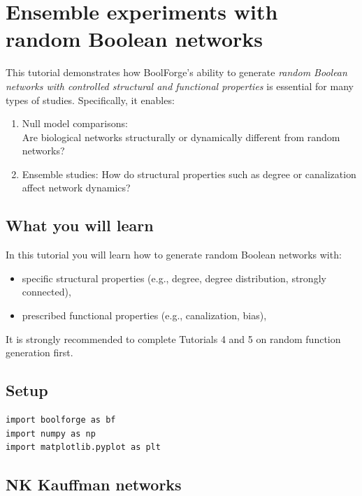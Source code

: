 \documentclass[
]{article}
\providecommand{\tightlist}{%
  \setlength{\itemsep}{0pt}\setlength{\parskip}{0pt}}
\begin{document}
\section{Ensemble experiments with random Boolean
networks}\label{ensemble-experiments-with-random-boolean-networks}

This tutorial demonstrates how BoolForge's ability to generate
\emph{random Boolean networks with controlled structural and functional
properties} is essential for many types of studies. Specifically, it
enables:

\begin{enumerate}
\def\labelenumi{\arabic{enumi}.}
\item
  Null model comparisons:\\
  Are biological networks structurally or dynamically different from
  random networks?
\item
  Ensemble studies: How do structural properties such as degree or
  canalization affect network dynamics?
\end{enumerate}

\subsection{What you will learn}\label{what-you-will-learn-9}

In this tutorial you will learn how to generate random Boolean networks
with:

\begin{itemize}
\tightlist
\item
  specific structural properties (e.g., degree, degree distribution,
  strongly connected),
\item
  prescribed functional properties (e.g., canalization, bias),
\end{itemize}

It is strongly recommended to complete Tutorials 4 and 5 on random
function generation first.

\subsection{Setup}\label{setup-9}

\begin{lstlisting}
import boolforge as bf
import numpy as np
import matplotlib.pyplot as plt
\end{lstlisting}

\subsection{NK Kauffman networks}\label{nk-kauffman-networks}
\end{document}
